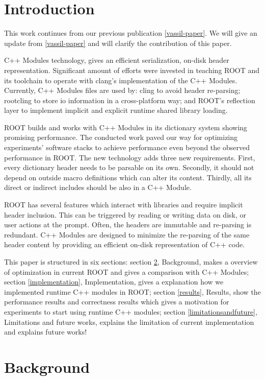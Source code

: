 \documentclass{webofc}
\begin{document}
\section{Introduction}
\label{intro}
This work continues from our previous publication \ref{vassil-paper}. We will give an update from \ref{vassil-paper} and will clarify the contribution of this paper.

C++ Modules technology, gives an efficient serialization, on-disk header representation. Significant amount of efforts were invested in teaching ROOT and its toolchain to operate with clang's implementation of the C++ Modules. Currently, C++ Modules files are used by: cling to avoid header re-parsing; rootcling to store io information in a cross-platform way; and ROOT's reflection layer to implement implicit and explicit runtime shared library loading.

ROOT builds and works with C++ Modules in its dictionary system showing promising performance. The conducted work paved our way for optimizing experiments' software stacks to achieve performance even beyond the observed performance in ROOT. The new technology adds three new requirements. First, every dictionary header needs to be parsable on its own. Secondly, it should not depend on outside macro definitions which can alter its content. Thirdly, all its direct or indirect includes should be also in a C++ Module.

ROOT has several features which interact with libraries and require implicit header inclusion. This can be triggered by reading or writing data on disk, or user actions at the prompt. Often, the headers are immutable and re-parsing is redundant. C++ Modules are designed to minimize the re-parsing of the same header content by providing an efficient on-disk representation of C++ code.

This paper is structured in six sections: section \ref{background}, Background, makes a overview of optimization in current ROOT and gives a comparison with C++ Modules; section \ref{implementation}, Implementation, gives a explanation how we implemented runtime C++ modules in ROOT; section \ref{results}, Results, show the performance results and correctness results which gives a motivation for experiments to start using runtime C++ modules; section \ref{limitationsandfuture}, Limitations and future works, explains the limitation of current implementation and explains future works!

\section{Background}
\label{background}
\end{document}
